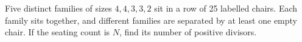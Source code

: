 Five distinct families of sizes $4,4,3,3,2$ sit in a row of 25 labelled chairs. Each family sits together, and different families are separated by at least one empty chair. If the seating count is $N$, find its number of positive divisors.
